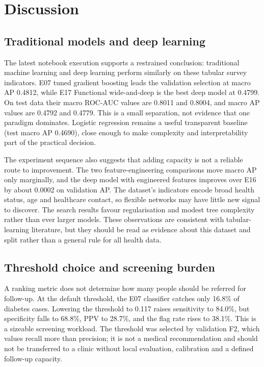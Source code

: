 \section{Discussion}
\label{sec:discussion}

\subsection{Traditional models and deep learning}
The latest notebook execution supports a restrained conclusion: traditional machine learning and deep learning perform similarly on these tabular survey indicators. E07 tuned gradient boosting leads the validation selection at macro AP 0.4812, while E17 Functional wide-and-deep is the best deep model at 0.4799. On test data their macro ROC-AUC values are 0.8011 and 0.8004, and macro AP values are 0.4792 and 0.4779. This is a small separation, not evidence that one paradigm dominates. Logistic regression remains a useful transparent baseline (test macro AP 0.4690), close enough to make complexity and interpretability part of the practical decision.

The experiment sequence also suggests that adding capacity is not a reliable route to improvement. The two feature-engineering comparisons move macro AP only marginally, and the deep model with engineered features improves over E16 by about 0.0002 on validation AP. The dataset's indicators encode broad health status, age and healthcare contact, so flexible networks may have little new signal to discover. The search results favour regularisation and modest tree complexity rather than ever larger models. These observations are consistent with tabular-learning literature, but they should be read as evidence about this dataset and split rather than a general rule for all health data.

\subsection{Threshold choice and screening burden}
A ranking metric does not determine how many people should be referred for follow-up. At the default threshold, the E07 classifier catches only 16.8\% of diabetes cases. Lowering the threshold to 0.117 raises sensitivity to 84.0\%, but specificity falls to 68.8\%, PPV to 28.7\%, and the flag rate rises to 38.1\%. This is a sizeable screening workload. The threshold was selected by validation F2, which values recall more than precision; it is not a medical recommendation and should not be transferred to a clinic without local evaluation, calibration and a defined follow-up capacity.

